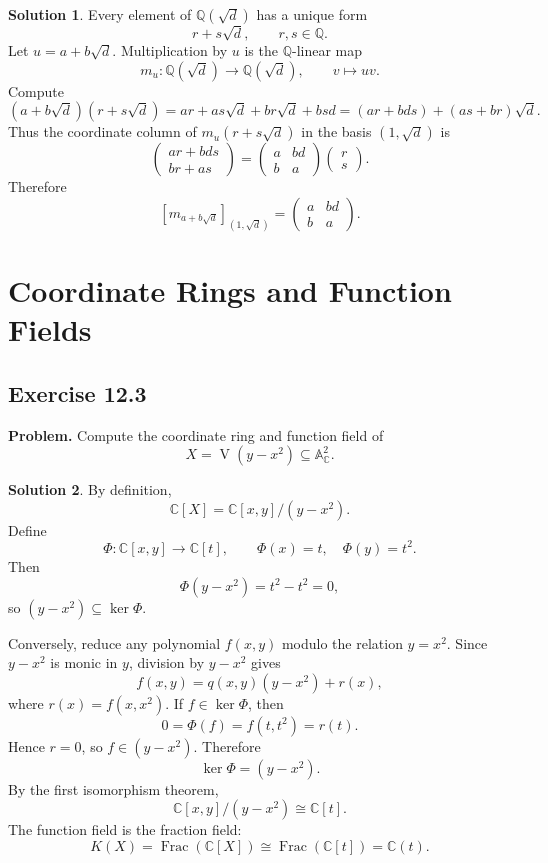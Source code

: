 \documentclass[11pt]{article}
\theoremstyle{definition}
\newtheorem*{solution}{Solution}
\newcommand{\A}{\mathbb{A}}
\newcommand{\C}{\mathbb{C}}
\newcommand{\Q}{\mathbb{Q}}
\newcommand{\K}{K}
\newcommand{\V}{\operatorname{V}}
\newcommand{\Frac}{\operatorname{Frac}}
\begin{document}
\begin{solution}
Every element of \(\Q(\sqrt d)\) has a unique form
\[
  r+s\sqrt d,\qquad r,s\in\Q.
\]
Let \(u=a+b\sqrt d\).  Multiplication by \(u\) is the \(\Q\)-linear map
\[
  m_u\colon \Q(\sqrt d)\longrightarrow \Q(\sqrt d),
  \qquad
  v\longmapsto uv.
\]
Compute
\[
  (a+b\sqrt d)(r+s\sqrt d)
  =
  ar+as\sqrt d+br\sqrt d+bs d
  =
  (ar+bds)+(as+br)\sqrt d.
\]
Thus the coordinate column of \(m_u(r+s\sqrt d)\) in the basis
\((1,\sqrt d)\) is
\[
  \begin{pmatrix}
    ar+bds\\
    br+as
  \end{pmatrix}
  =
  \begin{pmatrix}
    a & bd\\
    b & a
  \end{pmatrix}
  \begin{pmatrix}
    r\\
    s
  \end{pmatrix}.
\]
Therefore
\[
  [m_{a+b\sqrt d}]_{(1,\sqrt d)}
  =
  \begin{pmatrix}
    a & bd\\
    b & a
  \end{pmatrix}.
\]
\end{solution}

\section{Coordinate Rings and Function Fields}

\subsection*{Exercise 12.3}
\textbf{Problem.}  Compute the coordinate ring and function field of
\[
  X=\V(y-x^2)\subseteq \A^2_{\C}.
\]

\begin{solution}
By definition,
\[
  \C[X]=\C[x,y]/(y-x^2).
\]
Define
\[
  \Phi\colon \C[x,y]\longrightarrow \C[t],
  \qquad
  \Phi(x)=t,\quad \Phi(y)=t^2.
\]
Then
\[
  \Phi(y-x^2)=t^2-t^2=0,
\]
so \((y-x^2)\subseteq\ker\Phi\).

Conversely, reduce any polynomial \(f(x,y)\) modulo the relation
\(y=x^2\).  Since \(y-x^2\) is monic in \(y\), division by \(y-x^2\) gives
\[
  f(x,y)=q(x,y)(y-x^2)+r(x),
\]
where \(r(x)=f(x,x^2)\).  If \(f\in\ker\Phi\), then
\[
  0=\Phi(f)=f(t,t^2)=r(t).
\]
Hence \(r=0\), so \(f\in (y-x^2)\).  Therefore
\[
  \ker\Phi=(y-x^2).
\]
By the first isomorphism theorem,
\[
  \C[x,y]/(y-x^2)\cong \C[t].
\]
The function field is the fraction field:
\[
  \K(X)=\Frac(\C[X])\cong \Frac(\C[t])=\C(t).
\]
\end{solution}
\end{document}
